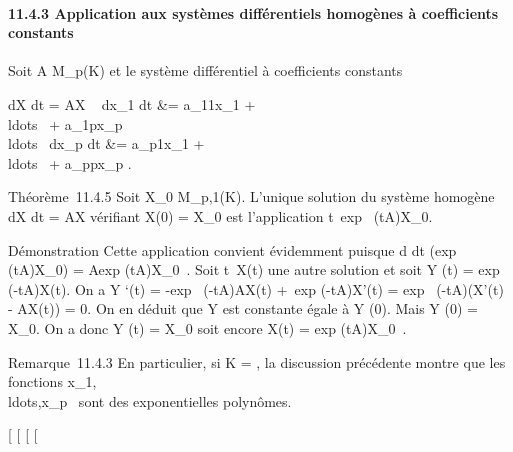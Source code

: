 \documentclass[]{article}
\begin{document}
\paragraph{11.4.3 Application aux systèmes différentiels homogènes à
coefficients constants}

Soit A \in M_p(K) et le système différentiel à coefficients
constants

 dX \over dt = AX \Leftrightarrow
\left \ \cases 
dx_1 \over dt &= a_11x_1 +
\\ldots~ +
a_1px_p \cr
\\ldots~
\cr  dx_p \over dt &=
a_p1x_1 +
\\ldots~ +
a_ppx_p  \right .

Théorème~11.4.5 Soit X_0 \in M_p,1(K). L'unique solution
du système homogène  dX \over dt = AX vérifiant X(0)
= X_0 est l'application
t\mapsto~exp~
(tA)X_0.

Démonstration Cette application convient évidemment puisque  d
\over dt (exp~
(tA)X_0) = Aexp (tA)X_0~.
Soit t\mapsto~X(t) une autre solution et soit Y (t)
= exp~ (-tA)X(t). On a Y `(t) =
-exp~ (-tA)AX(t) +\
exp (-tA)X'(t) = exp~ (-tA)(X'(t) - AX(t)) =
0. On en déduit que Y est constante égale à Y (0). Mais Y (0) =
X_0. On a donc Y (t) = X_0 soit encore X(t)
= exp (tA)X_0~.

Remarque~11.4.3 En particulier, si K = , la discussion précédente
montre que les fonctions
x_1,\\ldots,x_p~
sont des exponentielles polynômes.

{[}
{[}
{[}
{[}
\end{document}
